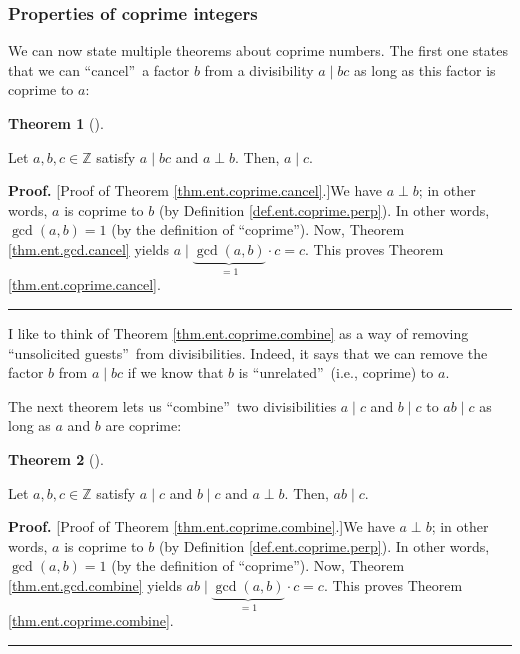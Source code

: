 \documentclass[numbers=enddot,12pt,final,onecolumn,notitlepage]{scrartcl}%
\numberwithin{exer}{subsection}
\theoremstyle{definition}
\newtheorem{theo}{Theorem}[subsection]
\newenvironment{theorem}[1][]
{\begin{theo}[#1]\begin{leftbar}}
{\end{leftbar}\end{theo}}
\newenvironment{proof}[1][Proof]{\noindent\textbf{#1.} }{\ \rule{0.5em}{0.5em}}
\begin{document}
\subsubsection{Properties of coprime integers}

We can now state multiple theorems about coprime numbers. The first one states
that we can \textquotedblleft cancel\textquotedblright\ a factor $b$ from a
divisibility $a\mid bc$ as long as this factor is coprime to $a$:

\begin{theorem}
\label{thm.ent.coprime.cancel}Let $a,b,c\in\mathbb{Z}$ satisfy $a\mid bc$ and
$a\perp b$. Then, $a\mid c$.
\end{theorem}

\begin{proof}
[Proof of Theorem \ref{thm.ent.coprime.cancel}.]We have $a\perp b$; in other
words, $a$ is coprime to $b$ (by Definition \ref{def.ent.coprime.perp}). In
other words, $\gcd\left(  a,b\right)  =1$ (by the definition of
\textquotedblleft coprime\textquotedblright). Now, Theorem
\ref{thm.ent.gcd.cancel} yields $a\mid\underbrace{\gcd\left(  a,b\right)
}_{=1}\cdot c=c$. This proves Theorem \ref{thm.ent.coprime.cancel}.
\end{proof}

I like to think of Theorem \ref{thm.ent.coprime.combine} as a way of removing
\textquotedblleft unsolicited guests\textquotedblright\ from divisibilities.
Indeed, it says that we can remove the factor $b$ from $a\mid bc$ if we know
that $b$ is \textquotedblleft unrelated\textquotedblright\ (i.e., coprime) to
$a$.

The next theorem lets us \textquotedblleft combine\textquotedblright\ two
divisibilities $a\mid c$ and $b\mid c$ to $ab\mid c$ as long as $a$ and $b$
are coprime:

\begin{theorem}
\label{thm.ent.coprime.combine}Let $a,b,c\in\mathbb{Z}$ satisfy $a\mid c$ and
$b\mid c$ and $a\perp b$. Then, $ab\mid c$.
\end{theorem}

\begin{proof}
[Proof of Theorem \ref{thm.ent.coprime.combine}.]We have $a\perp b$; in other
words, $a$ is coprime to $b$ (by Definition \ref{def.ent.coprime.perp}). In
other words, $\gcd\left(  a,b\right)  =1$ (by the definition of
\textquotedblleft coprime\textquotedblright). Now, Theorem
\ref{thm.ent.gcd.combine} yields $ab\mid\underbrace{\gcd\left(  a,b\right)
}_{=1}\cdot c=c$. This proves Theorem \ref{thm.ent.coprime.combine}.
\end{proof}
\end{document}
